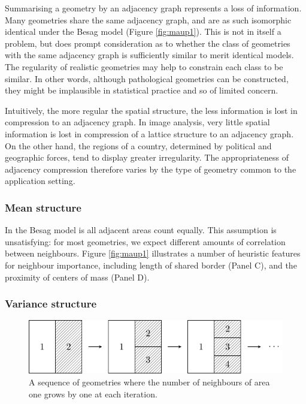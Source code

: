 \documentclass[a4paper, nobind]{templates/ociamthesis}
\begin{document}
Summarising a geometry by an adjacency graph represents a loss of information.
Many geometries share the same adjacency graph, and are as such isomorphic identical under the Besag model (Figure \ref{fig:maup1}).
This is not in itself a problem, but does prompt consideration as to whether the class of geometries with the same adjacency graph is sufficiently similar to merit identical models.
The regularity of realistic geometries may help to constrain each class to be similar.
In other words, although pathological geometries can be constructed, they might be implausible in statistical practice and so of limited concern.

Intuitively, the more regular the spatial structure, the less information is lost in compression to an adjacency graph.
In image analysis, very little spatial information is lost in compression of a lattice structure to an adjacency graph.
On the other hand, the regions of a country, determined by political and geographic forces, tend to display greater irregularity.
The appropriateness of adjacency compression therefore varies by the type of geometry common to the application setting.

\hypertarget{mean-structure}{%
\subsubsection{Mean structure}\label{mean-structure}}

In the Besag model is all adjacent areas count equally.
This assumption is unsatisfying: for most geometries, we expect different amounts of correlation between neighbours.
Figure \ref{fig:maup1} illustrates a number of heuristic features for neighbour importance, including length of shared border (Panel C), and the proximity of centers of mass (Panel D).

\hypertarget{variance-structure}{%
\subsubsection{Variance structure}\label{variance-structure}}



\begin{figure}
\includegraphics[width=0.95\linewidth]{figures/beyond-borders/maup2} \caption{A sequence of geometries where the number of neighbours of area one grows by one at each iteration.}\label{fig:maup2}
\end{figure}
\end{document}
